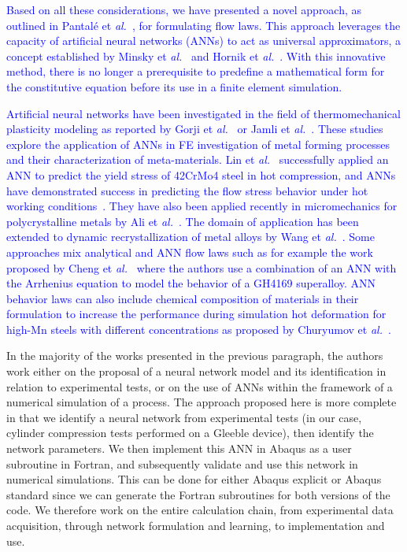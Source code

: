 \documentclass[algorithms,article,submit,pdftex,oneauthors]{Definitions/mdpi}
\makeatletter
\DeclareRobustCommand{\eal}{et \emph{al.}\@\xspace}
\makeatother
\begin{document}
\textcolor{blue}{Based on all these considerations, we have presented a novel approach, as outlined in Pantalé \eal~\cite{Pantale-2021-EIN, Pantale-2023-DIA}, for formulating flow laws.
This approach leverages the capacity of artificial neural networks (ANNs) to act as universal approximators, a concept established by Minsky \eal~\cite{Minsky-1969-PIC} and Hornik \eal~\cite{Hornik-1989-MFN}.
With this innovative method, there is no longer a prerequisite to predefine a mathematical form for the constitutive equation before its use in a finite element simulation.}

\textcolor{blue}{Artificial neural networks have been investigated in the field of thermomechanical plasticity modeling as reported by Gorji \eal~\cite{Gorji-2020} or Jamli \eal~\cite{Jamli-2019-SNN}.
These studies explore the application of ANNs in FE investigation of metal forming processes and their characterization of meta-materials.
Lin \eal~\cite{Lin-2008} successfully applied an ANN to predict the yield stress of 42CrMo4 steel in hot compression, and ANNs have demonstrated success in predicting the flow stress behavior under hot working conditions~\cite{Stoffel-2018-ANN, Stoffel-2019-NNB}.
They have also been applied recently in micromechanics for polycrystalline metals by Ali \eal~\cite{Ali-2019-AAN}.
The domain of application has been extended to dynamic recrystallization of metal alloys by Wang \eal~\cite{Wang-2021-ANN}.
Some approaches mix analytical and ANN flow laws such as for example the work proposed by Cheng \eal~\cite{Cheng-2022-CWD} where the authors use a combination of an ANN with the Arrhenius equation to model the behavior of a GH4169 superalloy.
ANN behavior laws can also include chemical composition of materials in their formulation to increase the performance during simulation hot deformation for high-Mn steels with different concentrations as proposed by Churyumov \eal~\cite{Churyumov-2023-PTS}.}

In the majority of the works presented in the previous paragraph, the authors work either on the proposal of a neural network model and its identification in relation to experimental tests, or on the use of ANNs within the framework of a numerical simulation of a process.
The approach proposed here is more complete in that we identify a neural network from experimental tests (in our case, cylinder compression tests performed on a Gleeble device), then identify the network parameters.
We then implement this ANN in Abaqus as a user subroutine in Fortran, and subsequently validate and use this network in numerical simulations.
This can be done for either Abaqus explicit or Abaqus standard since we can generate the Fortran subroutines for both versions of the code.
We therefore work on the entire calculation chain, from experimental data acquisition, through network formulation and learning, to implementation and use.
\end{document}
